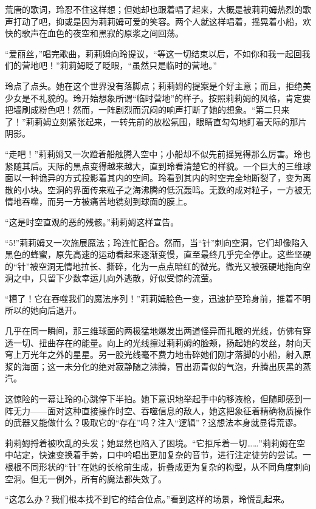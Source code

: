 荒唐的歌词，玲忍不住这样想；但她却也跟着唱了起来，大概是被莉莉姆热烈的歌声打动了吧，抑或是因为莉莉姆可爱的笑容。两个人就这样唱着，摇晃着小船，欢快的歌声在血色的夜空和黑寂的原浆之间回荡。

“爱丽丝，”唱完歌曲，莉莉姆向玲提议，“等这一切结束以后，不如你和我一起回我们的营地吧！”莉莉姆眨了眨眼，“虽然只是临时的营地。”

玲点了点头。她在这个世界没有落脚点；莉莉姆的提案是个好主意；而且，拒绝美少女是不礼貌的。玲开始想象所谓“临时营地”的样子。按照莉莉姆的风格，肯定要把墙刷成粉色吧！然而，一阵剧烈而沉闷的响声打断了她的想象。“第二只来了！”莉莉姆立刻紧张起来，一转先前的放松氛围，眼睛直勾勾地盯着天际的那片阴影。

“走吧！”莉莉姆又一次蹬着船舷腾入空中；小船却不似先前摇晃得那么厉害。玲也紧随其后。天际的黑点变得越来越大，直到玲看清楚它的样貌。一个巨大的三维球面以一种诡异的方式投影着其内的空间。玲看到其内的时空完全地断裂了，变为离散的小块。空洞的界面传来粒子之海沸腾的低沉轰鸣。无数的成对粒子，一方被无情地吞噬，而另一方被痛苦地镌刻到球面的膜上。

“这是时空直观的恶的残骸。”莉莉姆这样宣告。

“5!”莉莉姆又一次施展魔法；玲连忙配合。然而，当“针”刺向空洞，它们却像陷入黑色的蜂蜜，原先高速的运动看起来逐渐变慢，直至最终几乎完全停止。这些坚硬的“针”被空洞无情地拉长、撕碎，化为一点点暗红的微光。微光又被强硬地拖向空洞之中，只留下少数幸运儿向外逃散，好似受惊的流萤。

“糟了！它在吞噬我们的魔法序列！”莉莉姆脸色一变，迅速护至玲身前，推着不明所以的她向后退开。

几乎在同一瞬间，那三维球面的两极猛地爆发出两道怪异而扎眼的光线，仿佛有穿透一切、扭曲存在的能量。向上的光线擦过莉莉姆的脸颊，扬起她的发丝，射向天穹上万光年之外的星星。另一股光线毫不费力地击碎她们刚才落脚的小船，射入原浆的海面；这一未分化的绝对寂静随之沸腾，冒出沥青似的气泡，升腾出灰黑的蒸汽。

这惊险的一幕让玲的心跳停下半拍。她下意识地举起手中的移液枪，但随即感到一阵无力——面对这种直接操作时空、吞噬信息的敌人，她这把象征着精确物质操作的武器又能做什么？吸取它的“存在”吗？注入“逻辑”？这想法本身就显得荒谬。

莉莉姆捋着被吹乱的头发；她显然也陷入了困境。“它拒斥着一切……”莉莉姆在空中站定，快速变换着手势，口中吟唱出更加复杂的音节，进行注定徒劳的尝试。一根根不同形状的“针”在她的长枪前生成，折叠成更为复杂的构型，从不同角度刺向空洞。但无一例外，所有的魔法都失效了。

“这怎么办？我们根本找不到它的结合位点。”看到这样的场景，玲慌乱起来。

